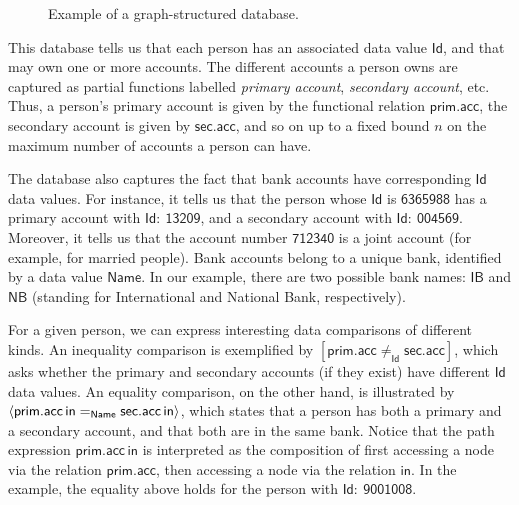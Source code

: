 \begin{figure}[t]
\begin{center}
    \end{center}
    \caption{Example of a graph-structured database.} 
    \label{fig:data-graph}
    \medskip\medskip\medskip
\end{figure}

This database tells us that each person has an associated data value $\mathsf{Id}$, and that may own one or more accounts. The different accounts a person owns are captured as partial functions labelled \emph{primary account}, \emph{secondary account}, etc. Thus, a person's primary account is given by the functional relation $\mathsf{prim.acc}$, the secondary account is given by $\mathsf{sec.acc}$, and so on up to a fixed bound $n$ on the maximum number of accounts a person can have.

The database also captures the fact that bank accounts have corresponding $\mathsf{Id}$ data values. For instance, it tells us that the person whose $\mathsf{Id}$ is $\mathsf{6365988}$ has a primary account with $\mathsf{Id{:\ }13209}$, and a secondary account with $\mathsf{Id{:\ }004569}$. Moreover, it tells us that the account number $\mathsf{712340}$ is a joint account (for example, for married people). Bank accounts belong to a unique bank, identified by a data value $\mathsf{Name}$. In our example, there are two possible bank names: $\mathsf{IB}$ and $\mathsf{NB}$ (standing for International and National Bank, respectively).

For a given person, we can express interesting data comparisons of different kinds. An inequality comparison is exemplified by $[\mathsf{prim.acc} \neq_{\mathsf{Id}} \mathsf{sec.acc}]$, which asks whether the primary and secondary accounts (if they exist) have different $\mathsf{Id}$ data values. An equality comparison, on the other hand, is illustrated by $\langle{\mathsf{prim.acc\,in} =_{\mathsf{Name}} \mathsf{sec.acc\,in }}\rangle$, which states that a person has both a primary and a secondary account, and that both are in the same bank. Notice that the path expression $\mathsf{prim.acc\,in}$ is interpreted as the composition of first accessing a node via the relation $\mathsf{prim.acc}$, then accessing a node via the relation $\mathsf{in}$. In the example, the equality above holds for the person with $\mathsf{Id{:\ }9001008}$.

